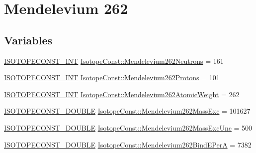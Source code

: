 \hypertarget{group___isotope_const-_mendelevium-_md262}{}\section{Mendelevium 262}
\label{group___isotope_const-_mendelevium-_md262}
\subsection*{Variables}
\begin{DoxyCompactItemize}
\item 
\mbox{\hyperlink{group___isotope_const-_macros_ga5f18360b3e99483a35c32d789e62621c}{I\+S\+O\+T\+O\+P\+E\+C\+O\+N\+S\+T\+\_\+\+I\+NT}} \mbox{\hyperlink{group___isotope_const-_mendelevium-_md262_ga484b087ce6d29c883e29fc7434bd7ebf}{Isotope\+Const\+::\+Mendelevium262\+Neutrons}} = 161
\item 
\mbox{\hyperlink{group___isotope_const-_macros_ga5f18360b3e99483a35c32d789e62621c}{I\+S\+O\+T\+O\+P\+E\+C\+O\+N\+S\+T\+\_\+\+I\+NT}} \mbox{\hyperlink{group___isotope_const-_mendelevium-_md262_gae2b427a849074d85a421223cb0118d00}{Isotope\+Const\+::\+Mendelevium262\+Protons}} = 101
\item 
\mbox{\hyperlink{group___isotope_const-_macros_ga5f18360b3e99483a35c32d789e62621c}{I\+S\+O\+T\+O\+P\+E\+C\+O\+N\+S\+T\+\_\+\+I\+NT}} \mbox{\hyperlink{group___isotope_const-_mendelevium-_md262_gaab5106c512e5220829ceb5e3faf01611}{Isotope\+Const\+::\+Mendelevium262\+Atomic\+Weight}} = 262
\item 
\mbox{\hyperlink{group___isotope_const-_macros_ga8f45a7272ce02c0b4c65c44636ed719a}{I\+S\+O\+T\+O\+P\+E\+C\+O\+N\+S\+T\+\_\+\+D\+O\+U\+B\+LE}} \mbox{\hyperlink{group___isotope_const-_mendelevium-_md262_ga092de479890f3eb5e3094b9acaf35b63}{Isotope\+Const\+::\+Mendelevium262\+Mass\+Exc}} = 101627
\item 
\mbox{\hyperlink{group___isotope_const-_macros_ga8f45a7272ce02c0b4c65c44636ed719a}{I\+S\+O\+T\+O\+P\+E\+C\+O\+N\+S\+T\+\_\+\+D\+O\+U\+B\+LE}} \mbox{\hyperlink{group___isotope_const-_mendelevium-_md262_gae49b300f49c064ab360cfe0e2ffb3b26}{Isotope\+Const\+::\+Mendelevium262\+Mass\+Exc\+Unc}} = 500
\item 
\mbox{\hyperlink{group___isotope_const-_macros_ga8f45a7272ce02c0b4c65c44636ed719a}{I\+S\+O\+T\+O\+P\+E\+C\+O\+N\+S\+T\+\_\+\+D\+O\+U\+B\+LE}} \mbox{\hyperlink{group___isotope_const-_mendelevium-_md262_ga56dba62a6af5a0e2772124f5339c9a00}{Isotope\+Const\+::\+Mendelevium262\+Bind\+E\+PerA}} = 7382

\end{DoxyCompactItemize}
